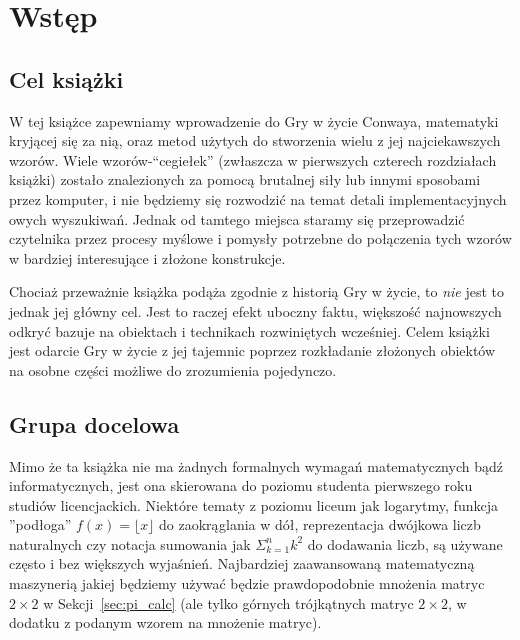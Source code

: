 \renewcommand{\chapterfolder}{preface/}
\chapter{Wstęp}


\section*{Cel książki}

W tej książce zapewniamy wprowadzenie do Gry w życie Conwaya, matematyki kryjącej się za nią, oraz metod użytych do stworzenia wielu z jej najciekawszych wzorów. Wiele wzorów-``cegiełek'' (zwłaszcza w pierwszych czterech rozdziałach książki) zostało znalezionych za pomocą brutalnej siły lub innymi sposobami przez komputer, i nie będziemy się rozwodzić na temat detali implementacyjnych owych wyszukiwań. Jednak od tamtego miejsca staramy się przeprowadzić czytelnika przez procesy myślowe i pomysły potrzebne do połączenia tych wzorów w bardziej interesujące i złożone konstrukcje.

Chociaż przeważnie książka podąża zgodnie z historią Gry w życie, to \emph{nie} jest to jednak jej główny cel. Jest to raczej efekt uboczny faktu, większość najnowszych odkryć bazuje na obiektach i technikach rozwiniętych wcześniej. Celem książki jest odarcie Gry w życie z jej tajemnic poprzez rozkładanie złożonych obiektów na osobne części możliwe do zrozumienia pojedynczo.


\section*{Grupa docelowa}

Mimo że ta książka nie ma żadnych formalnych wymagań matematycznych bądź informatycznych, jest ona skierowana do poziomu studenta pierwszego roku studiów licencjackich. Niektóre tematy z poziomu liceum jak logarytmy, funkcja ''podłoga'' $f(x) = \lfloor x \rfloor$ do zaokrąglania w dół, reprezentacja dwójkowa liczb naturalnych czy notacja sumowania jak $\Sigma_{k=1}^n k^2$ do dodawania liczb, są używane często i bez większych wyjaśnień. Najbardziej zaawansowaną matematyczną maszynerią jakiej będziemy używać będzie prawdopodobnie mnożenia matryc $2 \times 2$ w Sekcji~\ref{sec:pi_calc} (ale tylko górnych trójkątnych matryc $2 \times 2$, w dodatku z podanym wzorem na mnożenie matryc).

